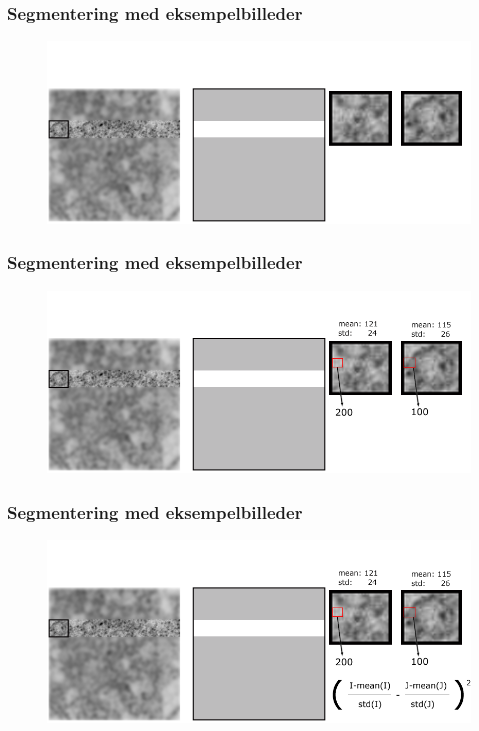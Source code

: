 \documentclass[12pt,t]{beamer}
\begin{document}
\begin{frame}
\frametitle{Segmentering med eksempelbilleder}
\begin{figure}[H]
\includegraphics[scale=0.35]{img/afstand/6.png}
\end{figure}
\end{frame}


\begin{frame}
\frametitle{Segmentering med eksempelbilleder}
\begin{figure}[H]
\includegraphics[scale=0.35]{img/afstand/7.png}
\end{figure}
\end{frame}


\begin{frame}
\frametitle{Segmentering med eksempelbilleder}
\begin{figure}[H]
\includegraphics[scale=0.35]{img/afstand/8.png}
\end{figure}
\end{frame}
\end{document}
